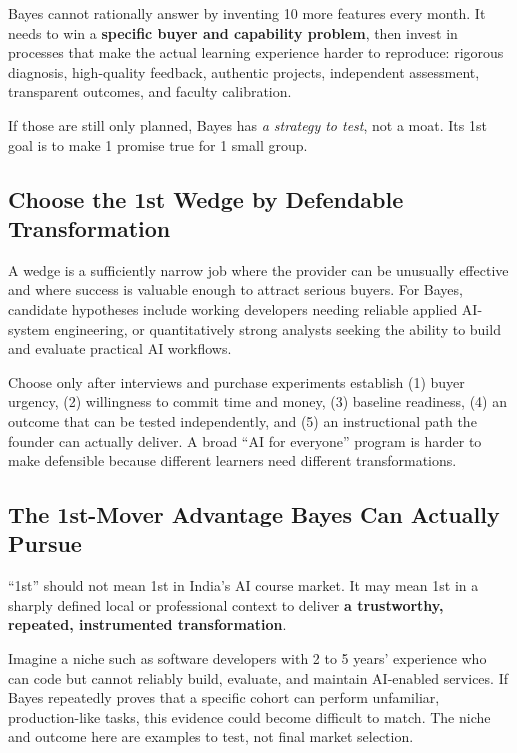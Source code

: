 Bayes cannot rationally answer by inventing 10 more features every month. It needs to win a \textbf{specific buyer and capability problem}, then invest in processes that make the actual learning experience harder to reproduce: rigorous diagnosis, high-quality feedback, authentic projects, independent assessment, transparent outcomes, and faculty calibration.

If those are still only planned, Bayes has \textit{a strategy to test}, not a moat. Its 1st goal is to make 1 promise true for 1 small group.

\subsection{Choose the 1st Wedge by Defendable Transformation}
\label{sec:choose_first_wedge_transformation}

A wedge is a sufficiently narrow job where the provider can be unusually effective and where success is valuable enough to attract serious buyers. For Bayes, candidate hypotheses include working developers needing reliable applied AI-system engineering, or quantitatively strong analysts seeking the ability to build and evaluate practical AI workflows.

Choose only after interviews and purchase experiments establish (1) buyer urgency, (2) willingness to commit time and money, (3) baseline readiness, (4) an outcome that can be tested independently, and (5) an instructional path the founder can actually deliver. A broad ``AI for everyone'' program is harder to make defensible because different learners need different transformations.

\subsection{The 1st-Mover Advantage Bayes Can Actually Pursue}
\label{sec:first_mover_advantage_bayes}

``1st'' should not mean 1st in India's AI course market. It may mean 1st in a sharply defined local or professional context to deliver \textbf{a trustworthy, repeated, instrumented transformation}.

Imagine a niche such as software developers with 2 to 5 years' experience who can code but cannot reliably build, evaluate, and maintain AI-enabled services. If Bayes repeatedly proves that a specific cohort can perform unfamiliar, production-like tasks, this evidence could become difficult to match. The niche and outcome here are examples to test, not final market selection.


